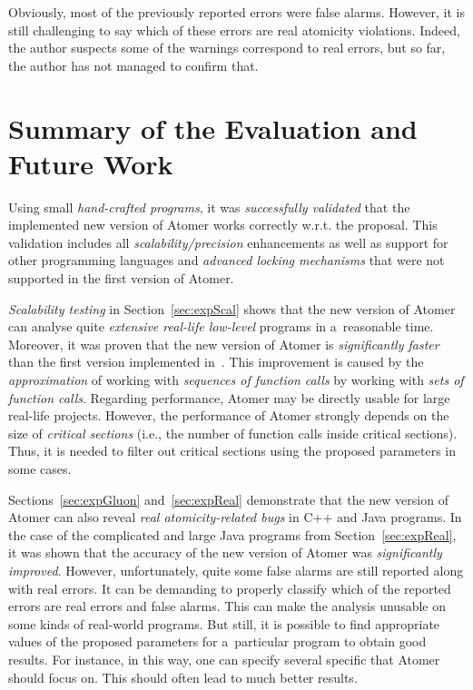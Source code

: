 Obviously, most of the previously reported errors were false alarms. However, it is still challenging to say which of these errors are real atomicity violations. Indeed, the author suspects some of the warnings correspond to real errors, but so far, the author has not managed to confirm that.


\section{Summary of the Evaluation and Future Work}
\label{sec:expSummary}

Using small \emph{hand-crafted programs}, it was \emph{successfully validated} that the implemented new version of Atomer works correctly w.r.t. the proposal. This validation includes all \emph{scalability/precision} enhancements as well as support for other programming languages and \emph{advanced locking mechanisms} that were not supported in the first version of Atomer.

\emph{Scalability testing} in Section~\ref{sec:expScal} shows that the new version of Atomer can analyse quite \emph{extensive real-life low-level} programs in a~reasonable time. Moreover, it was proven that the new version of Atomer is \emph{significantly faster} than the first version implemented in~\cite{harmimBP}. This improvement is caused by the \emph{approximation} of working with \emph{sequences of function calls} by working with \emph{sets of function calls}. Regarding performance, Atomer may be directly usable for large real-life projects. However, the performance of Atomer strongly depends on the size of \emph{critical sections} (i.e., the number of function calls inside critical sections). Thus, it is needed to filter out  critical sections using the proposed parameters in some cases.

Sections~\ref{sec:expGluon} and~\ref{sec:expReal} demonstrate that the new version of Atomer can also reveal \emph{real atomicity-related bugs} in C++ and Java programs. In the case of the complicated and large Java programs from Section~\ref{sec:expReal}, it was shown that the accuracy of the new version of Atomer was \emph{significantly improved}. However, unfortunately, quite some false alarms are still reported along with real errors. It can be demanding to properly classify which of the reported errors are real errors and false alarms. This can make the analysis unusable on some kinds of real-world programs. But still, it is possible to find appropriate values of the proposed parameters for a~particular program to obtain good results. For instance, in this way, one can specify several specific  that Atomer should focus on. This should often lead to much better results.

